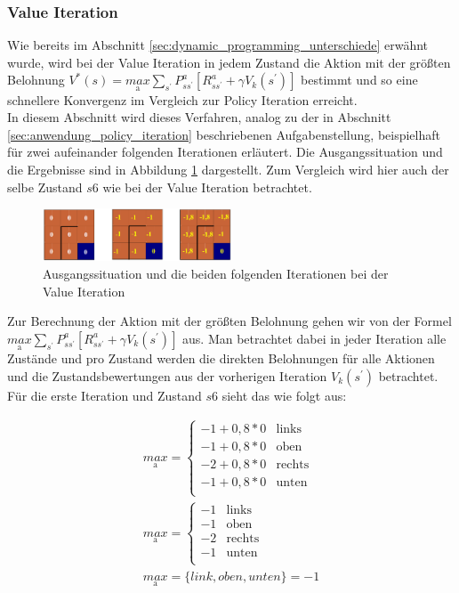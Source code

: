 \documentclass[10pt]{scrartcl}
\begin{document}
\subsubsection{Value Iteration}
\label{sec:anwendung_value_iteration}

Wie bereits im Abschnitt \ref{sec:dynamic_programming_unterschiede} erwähnt wurde, wird bei der Value Iteration in jedem Zustand die Aktion mit der größten Belohnung $V^{*}(s) = \underset{\text{a}}{max} \sum_{s^{'}} P^a_{ss^{'}} [R^a_{ss^{'}} + \gamma V_{k} (s^{'})]$ bestimmt und so eine schnellere Konvergenz im Vergleich zur Policy Iteration erreicht.\\
In diesem Abschnitt wird dieses Verfahren, analog zu der in Abschnitt \ref{sec:anwendung_policy_iteration} beschriebenen Aufgabenstellung, beispielhaft für zwei aufeinander folgenden Iterationen erläutert.
Die Ausgangssituation und die Ergebnisse sind in Abbildung \ref{fig:value_aufgabe} dargestellt.
Zum Vergleich wird hier auch der selbe Zustand $s6$ wie bei der Value Iteration betrachtet.\\ 

\begin{figure}[htbp]
	\centering	\includegraphics[width=0.5\textwidth]{Bilder/ValueIterationAufgabe}
	\caption{Ausgangssituation und die beiden folgenden Iterationen bei der Value Iteration}
	\label{fig:value_aufgabe}
\end{figure}

Zur Berechnung der Aktion mit der größten Belohnung gehen wir von der Formel $\underset{\text{a}}{max} \sum_{s^{'}} P^a_{ss^{'}} [R^a_{ss^{'}} + \gamma V_{k} (s^{'})]$ aus.
Man betrachtet dabei in jeder Iteration alle Zustände und pro Zustand werden die direkten Belohnungen für alle Aktionen und die Zustandsbewertungen aus der vorherigen Iteration $V_{k}(s^{'})$ betrachtet.
Für die erste Iteration und Zustand $s6$ sieht das wie folgt aus:

\begin{align}
	\underset{\text{a}}{max} = \begin{cases} 
		-1 + 0,8 * 0 & \text{links} \\ 
		-1 + 0,8 * 0 & \text{oben} \\
		-2 + 0,8 * 0 & \text{rechts} \\
		-1 + 0,8 * 0 & \text{unten} \\ 
 	\end{cases}\\
 	\underset{\text{a}}{max} = \begin{cases} 
		-1 & \text{links} \\ 
		-1 & \text{oben} \\
		-2 & \text{rechts} \\
		-1 & \text{unten} \\ 
 	\end{cases}\\
 	\underset{\text{a}}{max} = \{ link, oben, unten \} = -1
\end{align}
\end{document}
